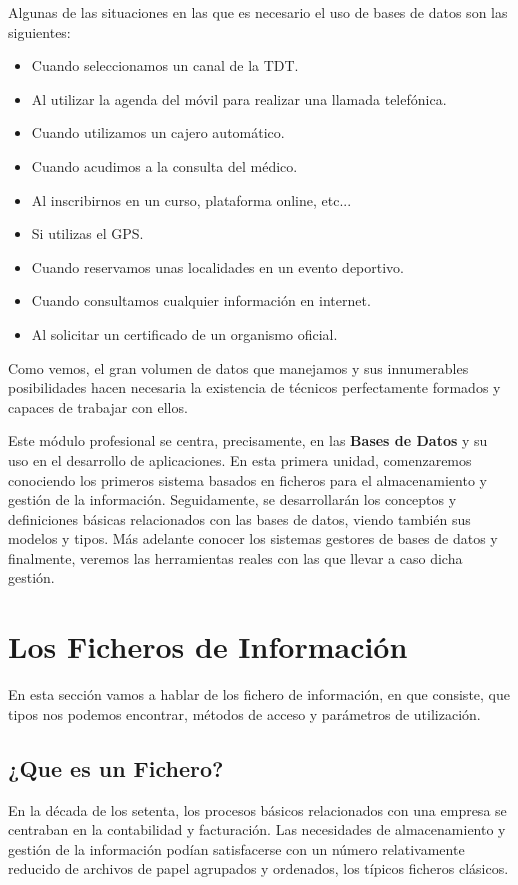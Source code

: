 Algunas de las situaciones en las que es necesario el uso de bases de datos son las siguientes:

\begin{itemize}
    \item Cuando seleccionamos un canal de la TDT.
    \item Al utilizar la agenda del móvil para realizar una llamada telefónica.
    \item Cuando utilizamos un cajero automático.
    \item Cuando acudimos a la consulta del médico.
    \item Al inscribirnos en un curso, plataforma online, etc...
    \item Si utilizas el GPS.
    \item Cuando reservamos unas localidades en un evento deportivo.
    \item Cuando consultamos cualquier información en internet.
    \item Al solicitar un certificado de un organismo oficial.
\end{itemize}

Como vemos, el gran volumen de datos que manejamos y sus innumerables posibilidades hacen necesaria la existencia de técnicos perfectamente formados y capaces de trabajar con ellos.

Este módulo profesional se centra, precisamente, en las \textbf{Bases de Datos} y su uso en el desarrollo de aplicaciones. En esta primera unidad, comenzaremos conociendo los primeros sistema basados en ficheros para el almacenamiento y gestión de la información.  Seguidamente, se desarrollarán los conceptos y definiciones básicas relacionados con las bases de datos, viendo también sus modelos y tipos. Más adelante conocer los sistemas gestores de bases de datos y finalmente, veremos las herramientas reales con las que llevar a caso dicha gestión.

\section{Los Ficheros de Información}
En esta sección vamos a hablar de los fichero de información, en que consiste, que tipos nos podemos encontrar, métodos de acceso y parámetros de utilización.

\subsection{¿Que es un Fichero?}
En la década de los setenta, los procesos básicos relacionados con una empresa se centraban en la contabilidad y facturación. Las necesidades de almacenamiento y gestión de la información podían satisfacerse con un número relativamente reducido de archivos de papel agrupados y ordenados, los típicos ficheros clásicos.

